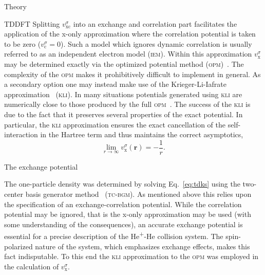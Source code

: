 \documentclass[aps, pra, reprint, groupedaddress, amsfonts, longbibliography,
               amsmath, amssymb, showpacs, nofootinbib]{revtex4-1}
\begin{document}
\begin{section}{Theory \label{sec:theory}}
\begin{subsection}{TDDFT \label{sec:tddft}}
      Splitting $v^\sigma_\mathrm{xc}$ into an exchange and correlation part facilitates the application
      of the x-only approximation where the correlation potential is taken to be zero
      ($v^\sigma_\mathrm{c} = 0$). Such a model which ignores dynamic correlation is usually referred to
      as an independent electron model (\textsc{iem}). Within this approximation $v^\sigma_\mathrm{x}$
      may be determined exactly via the optimized potential method (\textsc{opm})~\cite{opm1, opm2,
      tdopm}. The complexity of the \textsc{opm} makes it prohibitively difficult to implement in
      general. As a secondary option one may instead make use of the Krieger-Li-Iafrate
      approximation~\cite{klieq, tdkli1, tdkli2} (\textsc{kli}). In many situations potentials generated
      using \textsc{kli} are numerically close to those produced by the full
      \textsc{opm}~\cite{opm-rev}. The success of the \textsc{kli} is due to the fact that it preserves
      several properties of the exact potential. In particular, the \textsc{kli} approximation ensures
      the exact cancellation of the self-interaction in the Hartree term and thus maintains the correct
      asymptotics,
      \begin{equation} \label{eq:asymp}
         \lim\limits_{r \rightarrow \infty} v_\mathrm{x}^\sigma (\mathbf{r}) = -\frac{1}{r}.
      \end{equation}

   \end{subsection}

   \begin{subsection}{The exchange potential \label{sec:xpot}}

      The one-particle density was determined by solving Eq.~\eqref{eq:tdks} using the two-center basis
      generator method~\cite{tcbgm} (\textsc{tc-bgm}). As mentioned above this relies upon the
      specification of an exchange-correlation potential. While the correlation potential may be
      ignored, that is the x-only approximation may be used (with some understanding of the
      consequences), an accurate exchange potential is essential for a precise description of the
      He\textsuperscript{+}-He collision system. The spin-polarized nature of the system, which
      emphasizes exchange effects, makes this fact indisputable. To this end the \textsc{kli}
      approximation to the \textsc{opm} was employed in the calculation of $v^\sigma_\mathrm{x}$.


\end{subsection}
\end{section}
\end{document}
